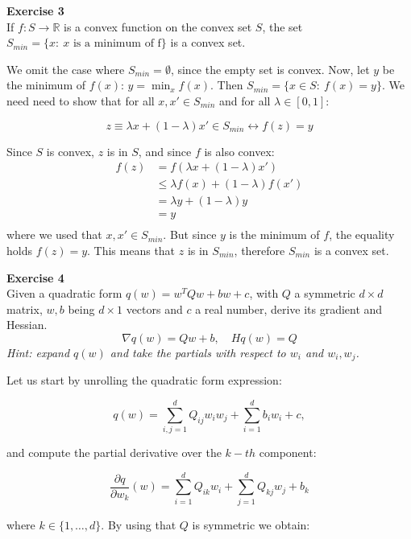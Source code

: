 \documentclass[11pt,table]{article}
\newenvironment{problem}[2][Exercise]
{ \begin{mdframed}[backgroundcolor=gray!20] \textbf{#1 #2} \\}
	{  \end{mdframed}}
\begin{document}
\begin{problem}{3}
If \( f: S \to \mathbb{R} \) is a convex function on the convex set \( S \), the set \( S_{min} = \{x : \ x \text{ is a minimum of f} \} \) is a convex set.
\end{problem}

We omit the case where \(S_{min} = \emptyset\), since the empty set is convex. Now, let \(y\) be the minimum of \(f(x)\): \(y = \min_x f(x)\). Then \( S_{min} = \{x \in S : \ f(x) = y \} \). We need need to show that for all \(x, x' \in S_{min}\) and for all \(\lambda \in [0,1]\):

\[
	z \equiv \lambda x + (1-\lambda) x' \in S_{min} \leftrightarrow f(z) = y
\]

Since \(S\) is convex, \(z\) is in \(S\), and since \(f\) is also convex:
\begin{align*}
	f(z) & = f\left(\lambda x + (1-\lambda) x'\right) \\
	     & \leq \lambda f(x) + (1-\lambda) f(x')      \\
	     & = \lambda y + (1-\lambda) y                \\
	     & = y                                        \\
\end{align*}
where we used that \(x, x'\in S_{min}\). But since \(y\) is the minimum of \(f\), the equality holds \(f(z) = y\). This means that \(z\) is in \(S_{min}\), therefore \(S_{min}\) is a convex set.

\begin{problem}{4}
Given a quadratic form \( q(w) = w^TQw + bw + c \), with \( Q \) a symmetric \( d\times d \) matrix, \( w,b\) being \(d\times 1 \) vectors and \( c \) a real number, derive its gradient and Hessian.
\[
	\nabla q(w) = Qw + b, \quad Hq(w) = Q
\]
\emph{Hint: expand \(q(w)\) and take the partials with respect to \(w_i\) and \(w_i,w_j\).}
\end{problem}

Let us start by unrolling the quadratic form expression:

\[
	q(w) = \sum_{i,j=1}^{d} Q_{ij} w_{i}w_{j} + \sum_{i=1}^{d}b_{i}w_{i} + c,
\]

and compute the partial derivative over the \(k-th\) component:

\[
	\frac{\partial q}{\partial w_k} (w) = \sum_{i=1}^{d} Q_{ik} w_{i} + \sum_{j=1}^{d} Q_{kj} w_{j} + b_{k}
\]

where \(k \in \{1, \ldots, d\}\). By using that \(Q\) is symmetric we obtain:
\end{document}
